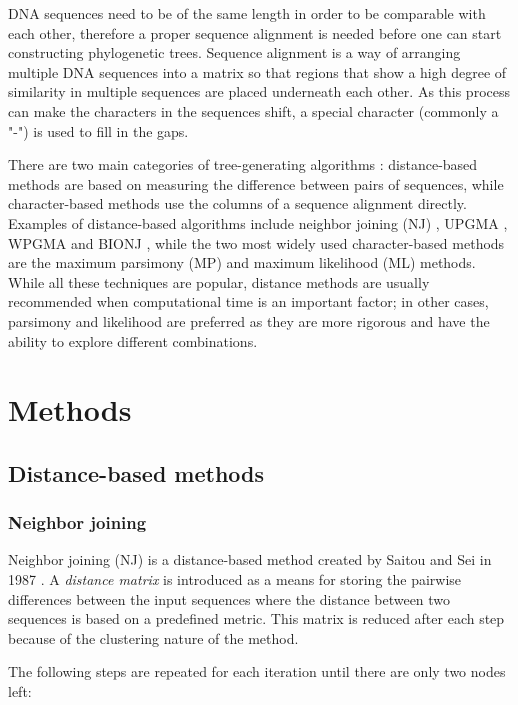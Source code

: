 \documentclass[11pt,twocolumn]{article}
\begin{document}
DNA sequences need to be of the same length in order to be comparable with each other, therefore a proper sequence alignment is needed before one can start constructing phylogenetic trees. Sequence alignment is a way of arranging multiple DNA sequences into a matrix so that regions that show a high degree of similarity in multiple sequences are placed underneath each other. As this process can make the characters in the sequences shift, a special character (commonly a "-") is used to fill in the gaps.

There are two main categories of tree-generating algorithms \cite{DeBruyn2013}: distance-based methods are based on measuring the difference between pairs of sequences, while character-based methods use the columns of a sequence alignment directly. Examples of distance-based algorithms include neighbor joining (NJ) \cite{1987}, UPGMA \cite{sokal58}, WPGMA \cite{sokal58} and BIONJ \cite{Gascuel1997}, while the two most widely used character-based methods are the maximum parsimony (MP) and maximum likelihood (ML) methods. While all these techniques are popular, distance methods are usually recommended when computational time is an important factor; in other cases, parsimony and likelihood are preferred as they are more rigorous and have the ability to explore different combinations.

\section{Methods}

\subsection{Distance-based methods}

\subsubsection{Neighbor joining}

Neighbor joining (NJ) is a distance-based method created by Saitou and Sei in 1987 \cite{1987}. A \textit{distance matrix} is introduced as a means for storing the pairwise differences between the input sequences where the distance between two sequences is based on a predefined metric. This matrix is reduced after each step because of the clustering nature of the method.

The following steps are repeated for each iteration until there are only two nodes left:
\end{document}
